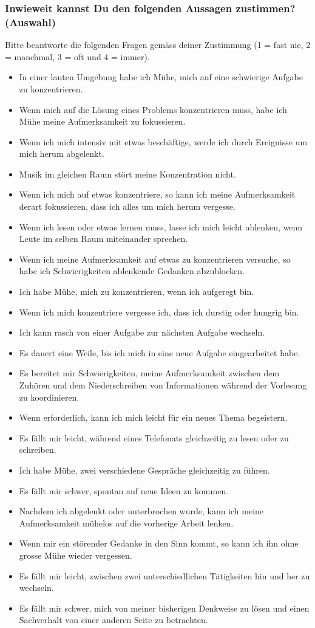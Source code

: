 \subsubsection*{Inwieweit kannst Du den folgenden Aussagen zustimmen? (Auswahl)}
Bitte beantworte die folgenden Fragen gemäss deiner Zustimmung (1 = fast nie, 2 = manchmal, 3 = oft und 4 = immer).
    \begin{itemize}
      \item In einer lauten Umgebung habe ich Mühe, mich auf eine schwierige Aufgabe zu konzentrieren.
      \item Wenn mich auf die Lösung eines Problems konzentrieren muss, habe ich Mühe meine Aufmerksamkeit zu fokussieren.
      \item Wenn ich mich intensiv mit etwas beschäftige, werde ich durch Ereignisse um mich herum abgelenkt.
      \item Musik im gleichen Raum stört meine Konzentration nicht.
      \item Wenn ich mich auf etwas konzentriere, so kann ich meine Aufmerksamkeit derart fokussieren, dass ich alles um mich herum vergesse.
      \item Wenn ich lesen oder etwas lernen muss, lasse ich mich leicht ablenken, wenn Leute im selben Raum miteinander sprechen.
      \item Wenn ich meine Aufmerksamkeit auf etwas zu konzentrieren versuche, so habe ich Schwierigkeiten ablenkende Gedanken abzublocken.
      \item Ich habe Mühe, mich zu konzentrieren, wenn ich aufgeregt bin.
      \item Wenn ich mich konzentriere vergesse ich, dass ich durstig oder hungrig bin.
      \item Ich kann rasch von einer Aufgabe zur nächsten Aufgabe wechseln.
      \item Es dauert eine Weile, bis ich mich in eine neue Aufgabe eingearbeitet habe.
      \item Es bereitet mir Schwierigkeiten, meine Aufmerksamkeit zwischen dem Zuhören und dem Niederschreiben von Informationen während der Vorlesung zu koordinieren.
      \item Wenn erforderlich, kann ich mich leicht für ein neues Thema begeistern.
      \item Es fällt mir leicht, während eines Telefonats gleichzeitig zu lesen oder zu schreiben.
      \item Ich habe Mühe, zwei verschiedene Gespräche gleichzeitig zu führen.
      \item Es fällt mir schwer, spontan auf neue Ideen zu kommen.
      \item Nachdem ich abgelenkt oder unterbrochen wurde, kann ich meine Aufmerksamkeit mühelos auf die vorherige Arbeit lenken.
      \item Wenn mir ein störender Gedanke in den Sinn kommt, so kann ich ihn ohne grosse Mühe wieder vergessen.
      \item Es fällt mir leicht, zwischen zwei unterschiedlichen Tätigkeiten hin und her zu wechseln.
      \item Es fällt mir schwer, mich von meiner bisherigen Denkweise zu lösen und einen Sachverhalt von einer anderen Seite zu betrachten.
    \end{itemize}
